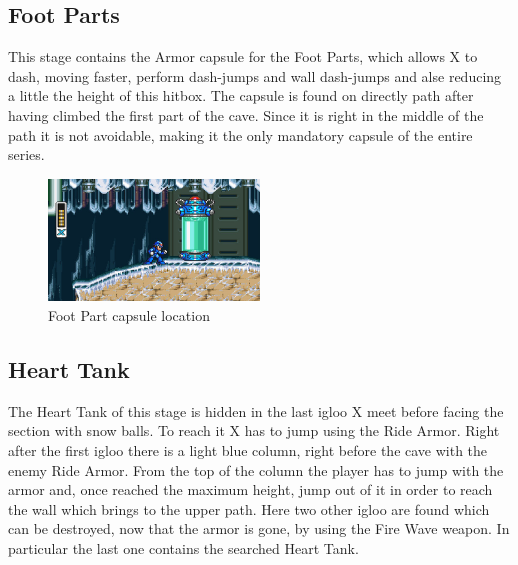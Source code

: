 \subsection{Foot Parts}\label{X:Foot_Parts}
This stage contains the Armor capsule for the Foot Parts, which allows X to dash, moving faster, perform dash-jumps and wall dash-jumps and alse reducing a little the height of this hitbox. The capsule is found on directly path after having climbed the first part of the cave. Since it is right in the middle of the path it is not avoidable, making it the only mandatory capsule of the entire series.
	\begin{figure}[h]
	\centering
	\includegraphics[width=0.5\textwidth]{figures/X1/Armor_foot.jpg}
	\caption{Foot Part capsule location}
\end{figure}
\subsection{Heart Tank}\label{Penguin:heart_tank}
The Heart Tank of this stage is hidden in the last igloo X meet before facing the section with snow balls. To reach it X has to jump using the Ride Armor. Right after the first igloo there is a light blue column, right before the cave with the enemy Ride Armor. From the top of the column the player has to jump with the armor and, once reached the maximum height, jump out of it in order to reach the wall which brings to the upper path. Here two other igloo are found which can be destroyed, now that the armor is gone, by using the Fire Wave weapon. In particular the last one contains the searched Heart Tank.


